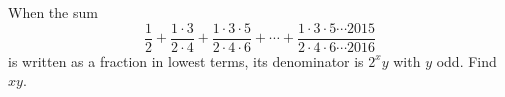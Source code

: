 When the sum
\[
\dfrac{1}{2}+\dfrac{1\cdot3}{2\cdot4}+\dfrac{1\cdot3\cdot5}{2\cdot4\cdot6}+\cdots+\dfrac{1\cdot3\cdot5\cdots2015}{2\cdot4\cdot6\cdots2016}
\]
is written as a fraction in lowest terms, its denominator is $2^xy$ with $y$ odd. Find $xy$.
